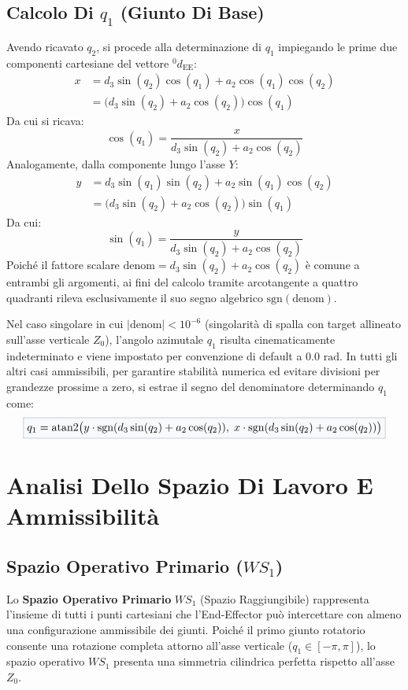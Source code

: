 \documentclass[11pt, a4paper]{report}
\begin{document}
\section{Calcolo Di $q_1$ (Giunto Di Base)}
Avendo ricavato $q_{2}$, si procede alla determinazione di $q_{1}$ impiegando le prime due componenti cartesiane del vettore ${}^{0}d_{\text{EE}}$:
\begin{align*}
    x &= d_3 \sin(q_2) \cos(q_1) + a_2 \cos(q_1) \cos(q_2)\\
    & = \biggl(d_3 \sin(q_2) + a_2 \cos(q_2)\biggr) \cos(q_1)
\end{align*}
Da cui si ricava:
\[
    \boxed{
        \cos(q_1) = \frac{x}{d_3 \sin(q_2) + a_2 \cos(q_2)}
    }
\]
Analogamente, dalla componente lungo l'asse $Y$:
\begin{align*}
    y &= d_3 \sin(q_1) \sin(q_2) + a_2 \sin(q_1) \cos(q_2)\\
    &= \biggl(d_3 \sin(q_2) + a_2 \cos(q_2)\biggr) \sin(q_1)
\end{align*}
Da cui:
\[
    \boxed{
        \sin(q_1) = \frac{y}{d_3 \sin(q_2) + a_2 \cos(q_2)}
    }
\]
Poiché il fattore scalare $\text{denom} = d_3 \sin(q_2) + a_2 \cos(q_2)$ è comune a entrambi gli argomenti, ai fini del calcolo tramite arcotangente a quattro quadranti rileva esclusivamente il suo segno algebrico $\text{sgn}(\text{denom})$.

Nel caso singolare in cui $|\text{denom}| < 10^{-6}$ (singolarità di spalla con target allineato sull'asse verticale $Z_0$), l'angolo azimutale $q_1$ risulta cinematicamente indeterminato e viene impostato per convenzione di default a $0.0\text{ rad}$. In tutti gli altri casi ammissibili, per garantire stabilità numerica ed evitare divisioni per grandezze prossime a zero, si estrae il segno del denominatore determinando $q_1$ come:
\[
    \fcolorbox{primaryNavy!40}{softBg}{$\displaystyle
        q_1 = \text{atan2}\bigl(y \cdot \text{sgn}(d_3 \sin(q_2) + a_2 \cos(q_2)), \; x \cdot \text{sgn}(d_3 \sin(q_2) + a_2 \cos(q_2))\bigr)
    $}
\]



\chapter{Analisi Dello Spazio Di Lavoro E Ammissibilità}
\label{chap:spazio_lavoro}

\section{Spazio Operativo Primario ($WS_{1}$)}
Lo \textbf{Spazio Operativo Primario} $WS_{1}$ (Spazio Raggiungibile) rappresenta l'insieme di tutti i punti cartesiani che l'End-Effector può intercettare con almeno una configurazione ammissibile dei giunti. Poiché il primo giunto rotatorio consente una rotazione completa attorno all'asse verticale ($q_1 \in [-\pi, \pi]$), lo spazio operativo $WS_{1}$ presenta una simmetria cilindrica perfetta rispetto all'asse $Z_0$.
\end{document}

